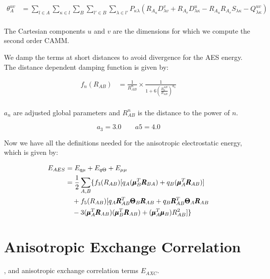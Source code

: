 \begin{equation}
\begin{split}
        \theta_A^{uv} &= \sum_{l \in A} \sum_{\kappa \in l} \sum_{B} \sum_{l' \in B} \sum_{\lambda \in l'} P_{\kappa \lambda} (R_{A_u} D_{\lambda v}^v + R_{A_v} D_{\lambda \kappa}^u - R_{A_u} R_{A_v} S_{\lambda \kappa} - Q_{\lambda \kappa}^{uv})\\
\end{split}
\end{equation}

The Cartesian components $u$ and $v$ are the dimensions for which we compute the second order CAMM.


We damp the terms at short distances to avoid divergence for the AES energy. The distance dependent damping function is given by:

\begin{equation}
\begin{split}
        f_n(R_{AB}) &=  \frac{1}{R_{AB}^n} \times \frac{1}{1 + 6 \left(\frac{R_0^{AB}}{R_{AB}}\right)^{a_n}}\\
\end{split}
\end{equation}

$a_n$ are adjusted global parameters and $R_{AB}^n$ is the distance to the power of $n$. 

\[
  a_3 = 3.0 \quad\quad a5 = 4.0
\]

Now we have all the definitions needed for the anisotropic electrostatic energy, which is given by:

\begin{equation}
\begin{split}
    \E{AES} &= \E{q\mu}+\E{q\Theta} + \E{\mu\mu}\\
    &= \frac{1}{2}\sum_{A,B}\{f_3(R_{AB})[q_A(\pmb{\mu}_B^T\pmb{R}_{BA})+q_B(\pmb{\mu}_A^T\pmb{R}_{AB})]\\
    &\quad + f_5(R_{AB})[q_A\pmb{R}_{AB}^T\pmb{\Theta}_B\pmb{R}_{AB}+q_B\pmb{R}_{AB}^T\pmb{\Theta}_A\pmb{R}_{AB}\\
    &\quad -3(\pmb{\mu}_A^T\pmb{R}_{AB})(\pmb{\mu}_B^T\pmb{R}_{AB}) + (\pmb{\mu}_A^T\pmb{\mu}_B)R_{AB}^2] \}\\
\end{split}
\end{equation}


\section{Anisotropic Exchange Correlation}

, and anisotropic exchange correlation terms $E_{AXC}$.
